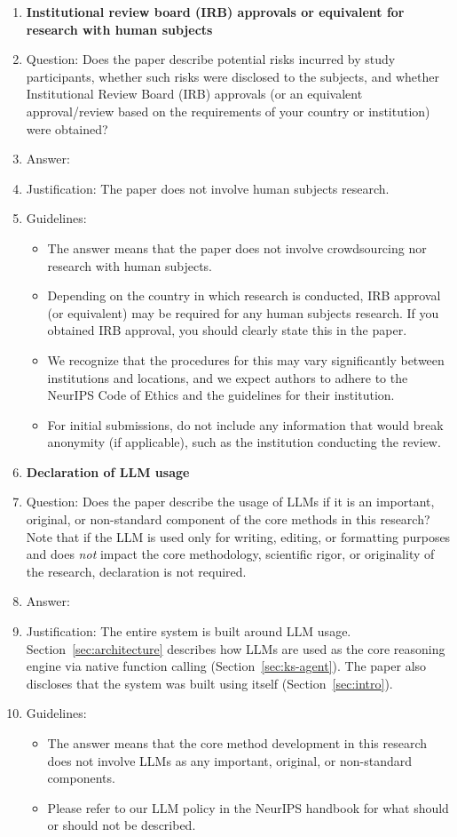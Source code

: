 \documentclass{article}
\begin{document}
\begin{enumerate}
\item {\bf Institutional review board (IRB) approvals or equivalent for research with human subjects}
    \item[] Question: Does the paper describe potential risks incurred by study participants, whether such risks were disclosed to the subjects, and whether Institutional Review Board (IRB) approvals (or an equivalent approval/review based on the requirements of your country or institution) were obtained?
    \item[] Answer: \answerNA{}
    \item[] Justification: The paper does not involve human subjects research.
    \item[] Guidelines:
    \begin{itemize}
        \item The answer \answerNA{} means that the paper does not involve crowdsourcing nor research with human subjects.
        \item Depending on the country in which research is conducted, IRB approval (or equivalent) may be required for any human subjects research. If you obtained IRB approval, you should clearly state this in the paper. 
        \item We recognize that the procedures for this may vary significantly between institutions and locations, and we expect authors to adhere to the NeurIPS Code of Ethics and the guidelines for their institution. 
        \item For initial submissions, do not include any information that would break anonymity (if applicable), such as the institution conducting the review.
    \end{itemize}

\item {\bf Declaration of LLM usage}
    \item[] Question: Does the paper describe the usage of LLMs if it is an important, original, or non-standard component of the core methods in this research? Note that if the LLM is used only for writing, editing, or formatting purposes and does \emph{not} impact the core methodology, scientific rigor, or originality of the research, declaration is not required.
    \item[] Answer: \answerYes{}
    \item[] Justification: The entire system is built around LLM usage. Section~\ref{sec:architecture} describes how LLMs are used as the core reasoning engine via native function calling (Section~\ref{sec:ks-agent}). The paper also discloses that the system was built using itself (Section~\ref{sec:intro}).
    \item[] Guidelines:
    \begin{itemize}
        \item The answer \answerNA{} means that the core method development in this research does not involve LLMs as any important, original, or non-standard components.
        \item Please refer to our LLM policy in the NeurIPS handbook for what should or should not be described.
    \end{itemize}

\end{enumerate}
\end{document}
